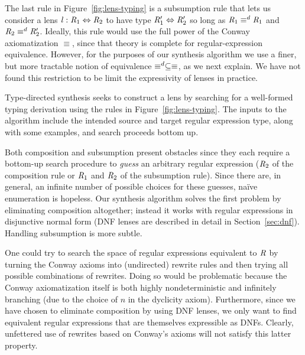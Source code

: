 \documentclass[numbers,10pt,preprint\ifanon ,nocopyrightspace\fi]{sigplanconf}
\begin{document}
The last rule in Figure~\ref{fig:lens-typing} is a subsumption rule
that lets us consider a lens
$\mathit{l} : \mathit{R}_1 \Leftrightarrow \mathit{R}_2$ to have type
$\mathit{R}_1' \Leftrightarrow \mathit{R}_2'$ so long as
$\mathit{R}_1 \equiv^d \mathit{R}_1$ and
$\mathit{R}_2 \equiv^d \mathit{R}_2'$.  Ideally, this rule would use
the full power of the Conway axiomatization $\equiv$, since that
theory is complete for regular-expression equivalence.  However, for
the purposes of our synthesis algorithm we use a finer, but more
tractable notion of equivalence $\equiv^d \subseteq \equiv$,
as we next explain.  We have not found this restriction to be limit
the expressivity of lenses in practice.


Type-directed synthesis seeks to construct a lens by searching for a
well-formed typing derivation using the rules in Figure~\ref{fig:lens-typing}.
The inputs to the algorithm include the intended source and target
regular expression type, along with some examples, and search proceeds
bottom up.  

Both composition and subsumption present obstacles 
since they each require a bottom-up search procedure to \textit{guess} an
arbitrary regular expression ($\mathit{R}_2$ of the composition rule or
$\mathit{R}_1$ and $\mathit{R}_2$ of the subsumption rule).  Since there are,
in general, an infinite number of possible choices for these guesses,
na\"{i}ve enumeration is hopeless.
Our synthesis algorithm  solves the first problem by eliminating
composition altogether; instead it works with regular expressions in
disjunctive normal form (DNF lenses are described in detail in
Section~\ref{sec:dnf}).  Handling subsumption is more subtle.

One could try to search the space of regular expressions equivalent to
$\mathit{R}$ by turning the Conway axioms into (undirected) rewrite rules
and then trying all possible combinations of rewrites.  Doing so would
be problematic because the Conway axiomatization itself is both highly
nondeterministic and infinitely branching (due to the choice of $n$ in
the dyclicity axiom).  Furthermore, since we have chosen to eliminate
composition by using DNF lenses, we only want to find equivalent
regular expressions that are themselves expressible as DNFs.  Clearly,
unfettered use of rewrites based on Conway's axioms will not satisfy
this latter property. 
\end{document}
